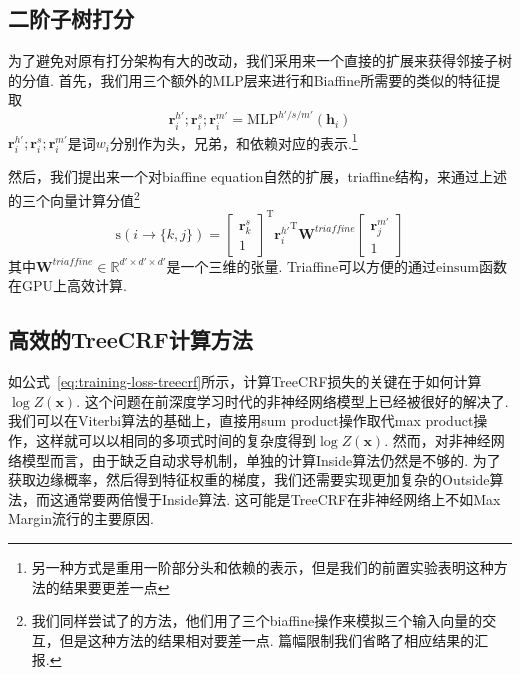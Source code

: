 \subsection{二阶子树打分}
为了避免对原有打分架构有大的改动，我们采用来一个直接的扩展来获得邻接子树的分值.
首先，我们用三个额外的MLP层来进行和Biaffine所需要的类似的特征提取
\begin{equation}
    \label{mlp-sib}
    \mathbf{r}_i^{h'}; \mathbf{r}_i^{s}; \mathbf{r}_i^{m'} =\mathrm{MLP}^{h'/s/m'} \left( \mathbf{h}_i \right)
\end{equation}
$\mathbf{r}_i^{h'}; \mathbf{r}_i^{s}; \mathbf{r}_i^{m'}$是词$w_i$分别作为头，兄弟，和依赖对应的表示.\footnote{
    另一种方式是重用一阶部分头和依赖的表示，但是我们的前置实验表明这种方法的结果要更差一点
}

然后，我们提出来一个对biaffine equation自然的扩展，triaffine结构，来通过上述的三个向量计算分值\footnote{
    我们同样尝试了\cite{wang-etal-2019-second}的方法，他们用了三个biaffine操作来模拟三个输入向量的交互，但是这种方法的结果相对要差一点.
    篇幅限制我们省略了相应结果的汇报.
}
\begin{equation} \label{eq:triaffine}
    \mathrm{s}(i\rightarrow \{k,j\}) =
    \left[
        \begin{array}{c}
            \mathbf{r}_{k}^{s} \\
            1
        \end{array}
        \right]^\mathrm{T}
    {\mathbf{r}_{i}^{h'}}^\mathrm{T}
    \mathbf{W}^\textit{triaffine}
    \left[
        \begin{array}{c}
            \mathbf{r}_{j}^{m'} \\
            1
        \end{array}
        \right]
\end{equation}
其中$\mathbf{W}^\textit{triaffine} \in \mathbb{R}^{d' \times d' \times d'}$是一个三维的张量.
Triaffine可以方便的通过$\mathrm{einsum}$函数在GPU上高效计算.

\subsection{高效的TreeCRF计算方法}

如公式~\ref{eq:training-loss-treecrf}所示，计算TreeCRF损失的关键在于如何计算$\log Z(\boldsymbol{x})$.
这个问题在前深度学习时代的非神经网络模型上已经被很好的解决了.
我们可以在Viterbi算法的基础上，直接用sum product操作取代max product操作，这样就可以以相同的多项式时间的复杂度得到$\log Z(\boldsymbol{x})$.
然而，对非神经网络模型而言，由于缺乏自动求导机制，单独的计算Inside算法仍然是不够的.
为了获取边缘概率，然后得到特征权重的梯度，我们还需要实现更加复杂的Outside算法，而这通常要两倍慢于Inside算法.
这可能是TreeCRF在非神经网络上不如Max Margin流行的主要原因.

